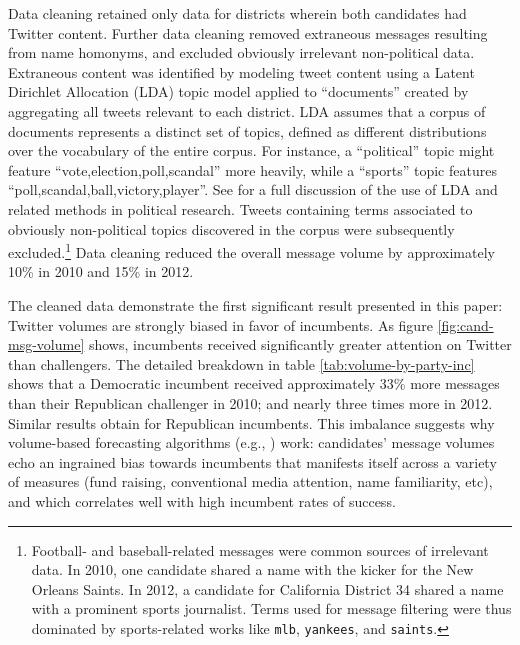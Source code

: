 \documentclass{article}
\begin{document}
Data cleaning retained only data for districts wherein both candidates
had Twitter content. Further data cleaning removed extraneous messages
resulting from name homonyms, and excluded obviously irrelevant
non-political data. Extraneous content was identified by modeling
tweet content using a Latent Dirichlet Allocation (LDA) topic model
\citep{blei2003latent} applied to ``documents'' created by aggregating
all tweets relevant to each district. LDA assumes that a corpus of
documents represents a distinct set of topics, defined as different
distributions over the vocabulary of the entire corpus. For instance, a ``political'' topic
might feature ``vote,election,poll,scandal'' more heavily, while a
``sports'' topic features ``poll,scandal,ball,victory,player''. See
\cite{grimmer2013text} for a full discussion of the use of LDA and related
methods in political research. Tweets containing terms associated
to obviously non-political topics discovered in the corpus were
subsequently excluded.\footnote{Football- and baseball-related messages were common
sources of irrelevant data. In 2010, one candidate shared a name with
the kicker for the New Orleans Saints. In 2012, a candidate for
California District 34 shared a name with a prominent sports
journalist. Terms used for message filtering were thus dominated by
sports-related works like \texttt{mlb},
\texttt{yankees}, and \texttt{saints}.} Data
cleaning reduced the overall message volume by approximately 10\% in
2010 and 15\% in 2012.

The cleaned data demonstrate the first significant result presented in
this paper: Twitter volumes are strongly biased in favor of
incumbents. As figure \ref{fig:cand-msg-volume} shows, incumbents
received significantly greater attention on Twitter than challengers.
The detailed breakdown in table \ref{tab:volume-by-party-inc} shows
that a Democratic incumbent received approximately 33\% more messages
than their Republican challenger in 2010; and nearly three times more
in 2012. Similar results obtain for Republican incumbents. This
imbalance suggests why volume-based forecasting algorithms (e.g.,
\cite{digrazia2013,tumasjan2010election,bermingham2011using}) work:
candidates' message volumes echo an ingrained bias towards incumbents
that manifests itself across a variety of measures (fund raising,
conventional media attention, name familiarity, etc), and which
correlates well with high incumbent rates of success. 

\end{document}
